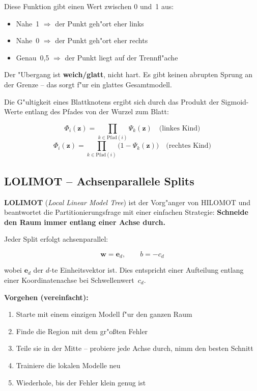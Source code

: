 \documentclass[12pt,a4paper]{article}
\begin{document}
Diese Funktion gibt einen Wert zwischen 0 und~1 aus:
\begin{itemize}
  \item Nahe~1 $\Rightarrow$ der Punkt geh"ort \glqq eher links\grqq{}
  \item Nahe~0 $\Rightarrow$ der Punkt geh"ort \glqq eher rechts\grqq{}
  \item Genau~0{,}5 $\Rightarrow$ der Punkt liegt auf der Trennfl"ache
\end{itemize}

\begin{hinweisbox}
Der "Ubergang ist \textbf{weich/glatt}, nicht hart. Es gibt keinen abrupten Sprung an der Grenze -- das sorgt f"ur ein glattes Gesamtmodell.
\end{hinweisbox}

Die G"ultigkeit eines Blattknotens ergibt sich durch das Produkt der Sigmoid-Werte entlang des Pfades von der Wurzel zum Blatt:

\begin{equation}
  \Phi_i(\mathbf{z}) = \prod_{k \in \mathrm{Pfad}(i)} \Psi_k(\mathbf{z})
  \quad \text{(linkes Kind)}
\end{equation}
\begin{equation}
  \Phi_i(\mathbf{z}) = \prod_{k \in \mathrm{Pfad}(i)} \bigl(1 - \Psi_k(\mathbf{z})\bigr)
  \quad \text{(rechtes Kind)}
\end{equation}

\subsection{LOLIMOT -- Achsenparallele Splits}

\textbf{LOLIMOT} (\textit{Local Linear Model Tree}) ist der Vorg"anger von HILOMOT und beantwortet die Partitionierungsfrage mit einer einfachen Strategie: \textbf{Schneide den Raum immer entlang einer Achse durch.}

Jeder Split erfolgt achsenparallel:

\begin{equation}
  \mathbf{w} = \mathbf{e}_d, \qquad b = -c_d
\end{equation}

wobei $\mathbf{e}_d$ der $d$-te Einheitsvektor ist. Dies entspricht einer Aufteilung entlang einer Koordinatenachse bei Schwellenwert~$c_d$.

\textbf{Vorgehen (vereinfacht):}
\begin{enumerate}
  \item Starte mit einem einzigen Modell f"ur den ganzen Raum
  \item Finde die Region mit dem gr"o\ss{}ten Fehler
  \item Teile sie in der Mitte -- probiere jede Achse durch, nimm den besten Schnitt
  \item Trainiere die lokalen Modelle neu
  \item Wiederhole, bis der Fehler klein genug ist
\end{enumerate}
\end{document}
